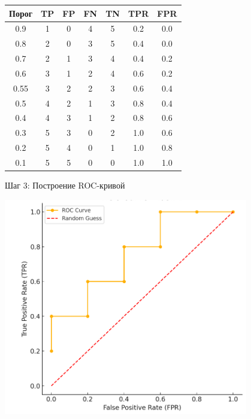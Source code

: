 \begin{table}[h!]
    \centering
    \begin{tabular}{|c|c|c|c|c|c|c|}
        \hline
        \textbf{Порог} & \textbf{TP} & \textbf{FP} & \textbf{FN} & \textbf{TN} & \textbf{TPR} & \textbf{FPR} \\
        \hline
        0.9            & 1           & 0           & 4           & 5           & 0.2          & 0.0          \\
        0.8            & 2           & 0           & 3           & 5           & 0.4          & 0.0          \\
        0.7            & 2           & 1           & 3           & 4           & 0.4          & 0.2          \\
        0.6            & 3           & 1           & 2           & 4           & 0.6          & 0.2          \\
        0.55           & 3           & 2           & 2           & 3           & 0.6          & 0.4          \\
        0.5            & 4           & 2           & 1           & 3           & 0.8          & 0.4          \\
        0.4            & 4           & 3           & 1           & 2           & 0.8          & 0.6          \\
        0.3            & 5           & 3           & 0           & 2           & 1.0          & 0.6          \\
        0.2            & 5           & 4           & 0           & 1           & 1.0          & 0.8          \\
        0.1            & 5           & 5           & 0           & 0           & 1.0          & 1.0          \\
        \hline
    \end{tabular}
\end{table}



Шаг 3: Построение ROC-кривой

\includegraphics[width=0.8\textwidth]{chapters/feature_selection/roc_task1.png}

